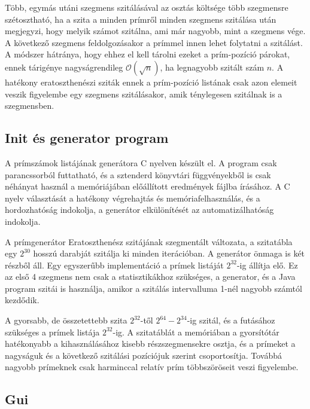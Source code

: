 Több, egymás utáni szegmens szitálásával az osztás
költsége több szegmensre szétosztható, ha a szita
a minden prímről minden szegmens szitálása után megjegyzi,
hogy melyik számot szitálna, ami már nagyobb, mint a szegmens vége.
A következő szegmens feldolgozásakor a prímmel innen lehet folytatni a szitálást.
A módszer hátránya, hogy ehhez el kell tárolni ezeket a prím-pozíció párokat,
ennek tárigénye nagyságrendileg $\mathcal{O}(\sqrt{n})$, ha legnagyobb
szitált szám $n$.
A hatékony eratoszthenészi sziták ennek a prím-pozíció listának
csak azon elemeit veszik figyelembe egy szegmens szitálásakor,
amik ténylegesen szitálnak is a szegmensben.

\subsection{Init és generator program}

A prímszámok listájának generátora C nyelven készült el.
A program csak parancssorból futtatható, és a sztenderd könyvtári függvényekből
is csak néhányat használ a memóriájában előállított eredmények fájlba írásához.
A C nyelv választását a hatékony végrehajtás és memóriafelhasználás, és  %
a hordozhatóság indokolja, a generátor elkülönítését az automatizálhatóság indokolja.

A prímgenerátor Eratoszthenész szitájának szegmentált változata,
a szitatábla egy $2^{30}$ hosszú darabját szitálja ki minden iterációban.
A generátor önmaga is két részből áll.
Egy egyszerűbb implementáció a prímek listáját $2^{32}$-ig állítja elő.
Ez az első 4 szegmens nem csak a statisztikákhoz szükséges,
a generator, és a Java program szitái is használja,
amikor a szitálás intervalluma 1-nél nagyobb számtól kezdődik.

A gyorsabb, de összetettebb szita $2^{32}$-től $2^{64}-2^{34}$-ig szitál,
és a futásához szükséges a prímek listája $2^{32}$-ig.
A szitatáblát a memóriában a gyorsítótár hatékonyabb a kihasználásához kisebb
részszegmensekre osztja,
és a prímeket a nagyságuk és a következő szitálási pozíciójuk szerint csoportosítja.
Továbbá nagyobb prímeknek csak harminccal relatív prím többszöröseit veszi figyelembe.

\subsection{Gui}

